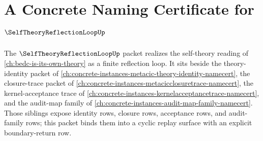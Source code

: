 \chapter{A Concrete Naming Certificate for $\SelfTheoryReflectionLoopUp$}
\label{ch:concrete-instances-self-theory-reflection-loop-namecert}

The $\SelfTheoryReflectionLoopUp$ packet realizes the self-theory reading of \autoref{ch:bedc-is-its-own-theory} as a finite reflection loop. It sits beside the theory-identity packet of \autoref{ch:concrete-instances-metacic-theory-identity-namecert}, the closure-trace packet of \autoref{ch:concrete-instances-metacicclosuretrace-namecert}, the kernel-acceptance trace of \autoref{ch:concrete-instances-kernelacceptancetrace-namecert}, and the audit-map family of \autoref{ch:concrete-instances-audit-map-family-namecert}. Those siblings expose identity rows, closure rows, acceptance rows, and audit-family rows; this packet binds them into a cyclic replay surface with an explicit boundary-return row.

